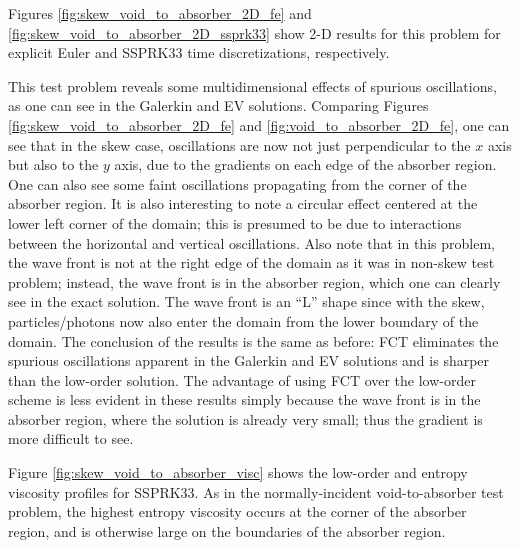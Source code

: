 Figures \ref{fig:skew_void_to_absorber_2D_fe} and
\ref{fig:skew_void_to_absorber_2D_ssprk33} show 2-D results for this problem
for explicit Euler and SSPRK33 time discretizations, respectively.

This test problem reveals some multidimensional effects of spurious
oscillations, as one can see in the Galerkin and EV solutions. Comparing
Figures \ref{fig:skew_void_to_absorber_2D_fe} and \ref{fig:void_to_absorber_2D_fe},
one can see that in the skew case, oscillations are now not just perpendicular
to the $x$ axis but also to the $y$ axis, due to the gradients on each
edge of the absorber region. One can also see some faint oscillations
propagating from the corner of the absorber region. It is also interesting
to note a circular effect centered at the lower left corner of the domain;
this is presumed to be due to interactions between the horizontal and
vertical oscillations. Also note that in this problem, the wave front
is not at the right edge of the domain as it was in non-skew test
problem; instead, the wave front is in the absorber region, which
one can clearly see in the exact solution. The wave front is an ``L''
shape since with the skew, particles/photons now also enter the domain
from the lower boundary of the domain. The conclusion of the results
is the same as before: FCT eliminates the spurious oscillations apparent
in the Galerkin and EV solutions and is sharper than the low-order
solution. The advantage of using FCT over the low-order scheme is
less evident in these results simply because the wave front is
in the absorber region, where the solution is already very small;
thus the gradient is more difficult to see.

Figure \ref{fig:skew_void_to_absorber_visc} shows the low-order
and entropy viscosity profiles for SSPRK33. As in the normally-incident
void-to-absorber test problem, the highest entropy viscosity occurs
at the corner of the absorber region, and is otherwise large on
the boundaries of the absorber region.

